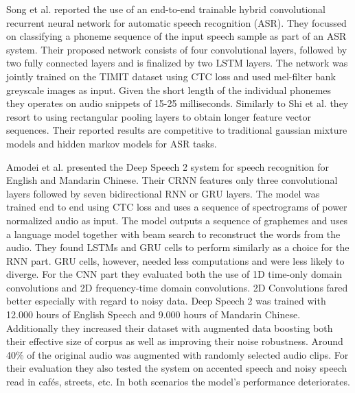 Song et al.\cite{song2015end} reported the use of an end-to-end trainable hybrid convolutional recurrent neural network for automatic speech recognition (ASR). They focussed on classifying a phoneme sequence of the input speech sample as part of an ASR system. Their proposed network consists of four convolutional layers, followed by two fully connected layers and is finalized by two LSTM layers. The network was jointly trained on the TIMIT dataset using CTC loss and used mel-filter bank greyscale images as input. Given the short length of the individual phonemes they operates on audio snippets of 15-25 milliseconds. Similarly to Shi et al.\cite{shi2016end} they resort to using rectangular pooling layers to obtain longer feature vector sequences. Their reported results are competitive to traditional gaussian mixture models and hidden markov models for ASR tasks. 

Amodei et al.\cite{amodei2015deep} presented the Deep Speech 2 system for speech recognition for English and Mandarin Chinese. Their CRNN features only three convolutional layers followed by seven bidirectional RNN or GRU layers. The model was trained end to end using CTC loss and uses a sequence of spectrograms of power normalized audio as input. The model outputs a sequence of graphemes and uses a language model together with beam search to reconstruct the words from the audio. They found LSTMs and GRU cells to perform similarly as a choice for the RNN part. GRU cells, however, needed less computations and were less likely to diverge. For the CNN part they evaluated both the use of 1D time-only domain convolutions and 2D frequency-time domain convolutions. 2D Convolutions fared better especially with regard to noisy data. 
Deep Speech 2 was trained with 12.000 hours of English Speech and 9.000 hours of Mandarin Chinese. Additionally they increased their dataset with augmented data boosting both their effective size of corpus as well as improving their noise robustness. Around 40\% of the original audio was augmented with randomly selected audio clips. For their evaluation they also tested the system on accented speech and noisy speech read in cafés, streets, etc. In both scenarios the model's performance deteriorates.

